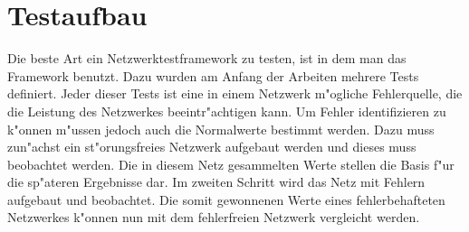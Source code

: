 \chapter{Testaufbau}
\label{cha:testaufbau}
Die beste Art ein Netzwerktestframework zu testen, ist in dem man das Framework benutzt. %
Dazu wurden am Anfang der Arbeiten mehrere Tests definiert. Jeder dieser Tests %
ist eine in einem Netzwerk m"ogliche Fehlerquelle, die die Leistung des Netzwerkes %
beeintr"achtigen kann. Um Fehler identifizieren %
zu k"onnen m"ussen jedoch auch die Normalwerte bestimmt werden. Dazu muss zun"achst ein %
st"orungsfreies Netzwerk aufgebaut werden und dieses muss beobachtet werden. %
Die in diesem Netz gesammelten Werte stellen die Basis f"ur die sp"ateren Ergebnisse dar. %
Im zweiten Schritt wird das Netz mit Fehlern aufgebaut und beobachtet. Die somit %
gewonnenen Werte eines fehlerbehafteten Netzwerkes k"onnen nun mit dem %
fehlerfreien Netzwerk vergleicht werden.  

